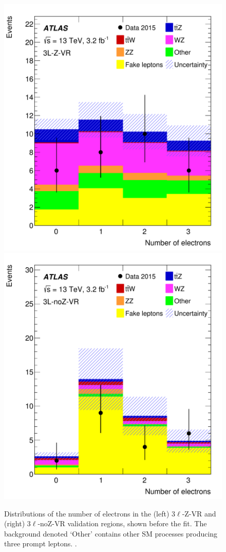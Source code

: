 \begin{figure}[htbp]
\centering
\includegraphics[width=\twofigwidth]{VR3lZ_nEl}
\includegraphics[width=\twofigwidth]{VR3lnoZ_nEl}
\caption{\label{fig:3l_val} Distributions of the number of electrons in the
(left) $3\ell$-Z-VR and (right) $3\ell$-noZ-VR validation regions, shown before
the fit.  The background denoted `Other' contains other SM processes producing
three prompt leptons.  \hatch.}
\end{figure}

